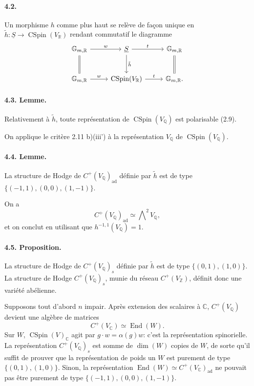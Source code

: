 \documentclass[10pt]{article}
\newcommand{\C}{\mathbb{C}}
\newcommand{\Q}{\mathbb{Q}}
\newcommand{\R}{\mathbb{R}}
\newcommand{\Z}{\mathbb{Z}}
\newcommand{\End}{\operatorname{End}}
\newcommand{\CSpin}{\operatorname{CSpin}}
\begin{document}
\paragraph{4.2.} Un morphisme $h$ comme plus haut se relève de façon unique en $\tilde h:\underline S\to\CSpin(V_\R)$ rendant commutatif le diagramme
\[
\begin{tikzcd}[column sep=2.6em,row sep=2.6em]
\mathbb G_{m,\R} \arrow[r,"w"] \arrow[d,equal] & \underline S \arrow[r,"t"] \arrow[d,"\tilde h"] & \mathbb G_{m,\R} \arrow[d,equal]\\
\mathbb G_{m,\R} \arrow[r,"w"] & \CSpin(V_\R) \arrow[r,"t"] & \mathbb G_{m,\R}.
\end{tikzcd}
\]




\paragraph{4.3. Lemme.} Relativement à $\tilde h$, toute représentation de $\CSpin(V_\Q)$ est polarisable (2.9).

On applique le critère 2.11 b)(iii') à la représentation $V_\Q$ de $\CSpin(V_\Q)$.

\paragraph{4.4. Lemme.} La structure de Hodge de $C^+(V_\Q)_{\mathrm{ad}}$ définie par $\tilde h$ est de type $\{(-1,1),(0,0),(1,-1)\}$.

On a
\[
C^+(V_\Q)_{\mathrm{ad}}\simeq\bigwedge\nolimits^2 V_\Q,
\]
et on conclut en utilisant que $h^{-1,1}(V_\Q)=1$.

\paragraph{4.5. Proposition.} La structure de Hodge de $C^+(V_\Q)_s$ définie par $\tilde h$ est de type $\{(0,1),(1,0)\}$. La structure de Hodge $C^+(V_\Q)_s$, munie du réseau $C^+(V_\Z)$, définit donc une variété abélienne.

Supposons tout d'abord $n$ impair. Après extension des scalaires à $\C$, $C^+(V_\Q)$ devient une algèbre de matrices
\[
C^+(V_\C)\simeq\End(W).
\]
Sur $W$, $\CSpin(V)_\C$ agit par $g\cdot w=\alpha(g)w$: c'est la représentation spinorielle. La représentation $C^+(V_\Q)_s$ est somme de $\dim(W)$ copies de $W$, de sorte qu'il suffit de prouver que la représentation de poids un $W$ est purement de type $\{(0,1),(1,0)\}$. Sinon, la représentation $\End(W)\simeq C^+(V_\C)_{\mathrm{ad}}$ ne pouvait pas être purement de type $\{(-1,1),(0,0),(1,-1)\}$.
\end{document}
